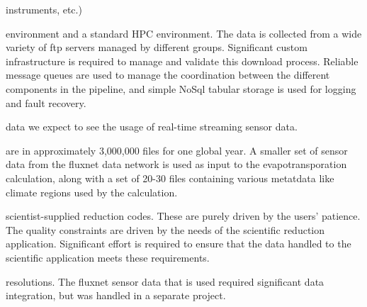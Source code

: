 \documentclass[times]{cpeauth}
\begin{document}
instruments, etc.)

environment and a standard HPC environment. The data is collected from a wide
variety of ftp servers managed by different groups. Significant custom
infrastructure is required to manage and validate this download
process. Reliable message queues are used to manage the coordination between the
different components in the pipeline, and simple NoSql tabular storage is used
for logging and fault recovery.


data we expect to see the usage of real-time streaming sensor data.


are in approximately 3,000,000 files for one global year. A smaller set of
sensor data from the fluxnet data network is used as input to the
evapotransporation calculation, along with a set of 20-30 files containing
various metatdata like climate regions used by the calculation.






scientist-supplied reduction codes. These are purely driven by the users'
patience. The quality constraints are driven by the needs of the scientific
reduction application. Significant effort is required to ensure that the data
handled to the scientific application meets these requirements.


resolutions. The fluxnet sensor data that is used required significant data
integration, but was handled in a separate project.
\end{document}
